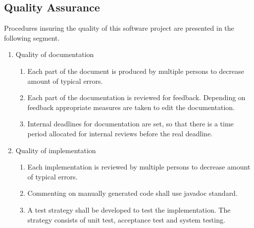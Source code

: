 \subsection{Quality Assurance}
Procedures insuring the quality of this software project are presented in the following segment.
\begin{enumerate}
	\item Quality of documentation
	\begin{enumerate}
		\item Each part of the document is produced by multiple persons to decrease amount of typical errors.
		\item Each part of the documentation is reviewed for feedback. Depending on feedback appropriate measures are taken to edit the documentation.
		\item Internal deadlines for documentation are set, so that there is a time period allocated for internal reviews before the real deadline.
	\end{enumerate}
	\item Quality of implementation
	\begin{enumerate}
		\item Each implementation is reviewed by multiple persons to decrease amount of typical errors.
		\item Commenting on manually generated code shall use javadoc standard.
		\item A test strategy shall be developed to test the implementation. The strategy consists of unit test, acceptance test and system testing.
	\end{enumerate}
\end{enumerate}